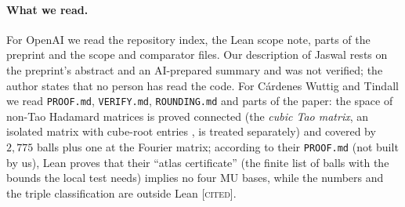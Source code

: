 \documentclass[11pt]{article}
\newcommand{\st}[1]{\textsc{[#1]}}
\newcommand{\stcited}{\st{cited}}
\theoremstyle{definition}
\theoremstyle{remark}
\begin{document}
\paragraph{What we read.} For OpenAI \cite{OAI,OAIF} we read the repository index, the Lean scope note, parts of the
preprint and the scope and comparator files. Our description of Jaswal \cite{Jaswal1,Jaswal2} rests on the
preprint's abstract and an AI-prepared summary and was not verified; the author states that no person has read the code. For C\'ardenes Wuttig
and Tindall \cite{CWT} we read \texttt{PROOF.md}, \texttt{VERIFY.md}, \texttt{ROUNDING.md} and parts of the paper: the space
of non-Tao Hadamard matrices is proved connected (the \emph{cubic Tao matrix}, an isolated matrix with cube-root entries
\cite{Tao04}, is treated separately) and covered by $2{,}775$ balls plus one at the Fourier matrix; according to their \texttt{PROOF.md} (not built by us), Lean proves that their
``atlas certificate'' (the finite list of balls with the bounds the local test needs) implies no four MU bases, while the
numbers and the triple classification are outside Lean \stcited.
\end{document}
